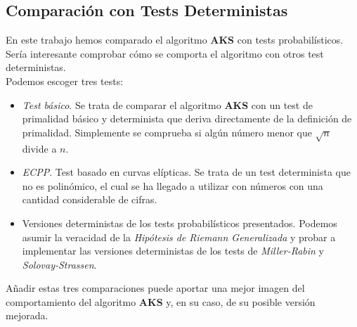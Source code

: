 \subsection{Comparación con Tests Deterministas}

En este trabajo hemos comparado el algoritmo \textbf{AKS} con tests probabilísticos. Sería interesante comprobar cómo se comporta el algoritmo con otros test deterministas.\\

Podemos escoger tres tests:

\begin{itemize}
	\item \textit{Test básico}. Se trata de comparar el algoritmo \textbf{AKS} con un test de primalidad básico y determinista que deriva directamente de la definición de primalidad. Simplemente se comprueba si algún número menor que $\sqrt{n}$ divide a $n$.
	
	\item \textit{ECPP}. Test basado en curvas elípticas. Se trata de un test determinista que no es polinómico, el cual se ha llegado a utilizar con números con una cantidad considerable de cifras.
	
	\item Versiones deterministas de los tests probabilísticos presentados. Podemos asumir la veracidad de la \textit{Hipótesis de Riemann Generalizada} y probar a implementar las versiones deterministas de los tests de \textit{Miller-Rabin} y \textit{Solovay-Strassen}.
\end{itemize}

Añadir estas tres comparaciones puede aportar una mejor imagen del comportamiento del algoritmo \textbf{AKS} y, en su caso, de su posible versión mejorada.

\endinput
